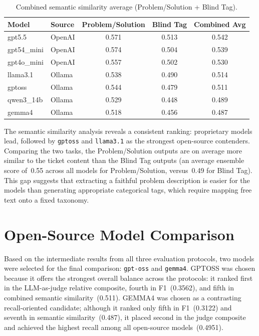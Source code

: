 \begin{table}[H]
    \centering
    \caption[Combined semantic similarity average]{Combined semantic similarity average (Problem/Solution + Blind Tag).}
    \label{tab:combined-avg}
    \begin{tabular}{llccc}
        \hline
        \textbf{Model} & \textbf{Source} & \textbf{Problem/Solution} & \textbf{Blind Tag} & \textbf{Combined Avg} \\
        \hline
        gpt5.5       & OpenAI & 0.571 & 0.513 & 0.542 \\
        gpt54\_mini  & OpenAI & 0.574 & 0.504 & 0.539 \\
        gpt4o\_mini  & OpenAI & 0.557 & 0.502 & 0.530 \\
        llama3.1     & Ollama & 0.538 & 0.490 & 0.514 \\
        gptoss       & Ollama & 0.544 & 0.479 & 0.511 \\
        qwen3\_14b   & Ollama & 0.529 & 0.448 & 0.489 \\
        gemma4       & Ollama & 0.518 & 0.456 & 0.487 \\
        \hline
    \end{tabular}
\end{table}

The semantic similarity analysis reveals a consistent ranking: proprietary
models lead, followed by \texttt{gptoss} and \texttt{llama3.1} as the
strongest open-source contenders.  Comparing the two tasks, the
Problem/Solution outputs are on average more similar to the ticket content
than the Blind Tag outputs (an average ensemble score of~0.55 across all
models for Problem/Solution, versus~0.49 for Blind Tag).  This gap suggests
that extracting a faithful problem description is easier for the models than
generating appropriate categorical tags, which require mapping free text onto
a fixed taxonomy.

\section{Open-Source Model Comparison}
\label{sec:res-oss}
%
Based on the intermediate results from all three evaluation protocols, two
models were selected for the final comparison: \texttt{gpt-oss} and
\texttt{gemma4}.  GPTOSS was chosen because it offers the strongest overall
balance across the protocols: it ranked first in the LLM-as-judge relative
composite, fourth in F1~(0.3562), and fifth in combined semantic
similarity~(0.511).  GEMMA4 was chosen as a contrasting recall-oriented
candidate; although it ranked only fifth in F1~(0.3122) and seventh in semantic
similarity~(0.487), it placed second in the judge composite and achieved the
highest recall among all open-source models~(0.4951).

